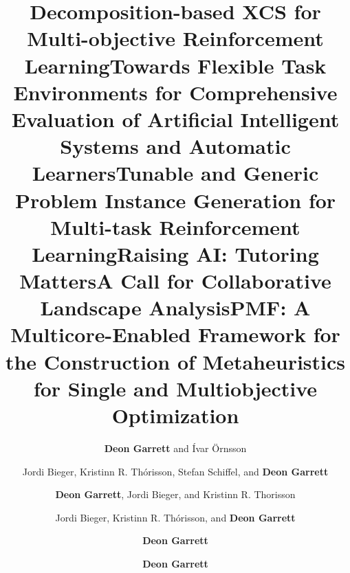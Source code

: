 \documentclass[a4paper,10pt]{cvclean}
\begin{document}
\begin{publications}
  \begin{conferencepapers}
    \begin{paper}
      \title{Decomposition-based XCS for Multi-objective Reinforcement Learning}
      \author{\textbf{Deon Garrett} and {\'I}var {\"O}rnsson}
    \end{paper}
    \begin{paper}
      \title{Towards Flexible Task Environments for Comprehensive Evaluation of Artificial Intelligent Systems and Automatic Learners}
      \author{Jordi Bieger, Kristinn R. Thórisson, Stefan Schiffel, and \textbf{Deon Garrett}}
    \end{paper}
    \begin{paper}
      \title{Tunable and Generic Problem Instance Generation for Multi-task
        Reinforcement Learning}
      \author{\textbf{Deon Garrett}, Jordi Bieger, and Kristinn R. Thorisson}
    \end{paper}
    \begin{paper}
      \title{Raising AI: Tutoring Matters}
      \author{Jordi Bieger, Kristinn R. Thórisson, and \textbf{Deon Garrett}}
    \end{paper}
    \begin{paper}
      \title{A Call for Collaborative Landscape Analysis}
      \author{\textbf{Deon Garrett}}
    \end{paper}
    \begin{paper}
      \title{PMF: A Multicore-Enabled Framework for the Construction of
        Metaheuristics for Single and Multiobjective Optimization}
      \author{\textbf{Deon Garrett}}

\end{paper}
\end{conferencepapers}
\end{publications}
\end{document}
